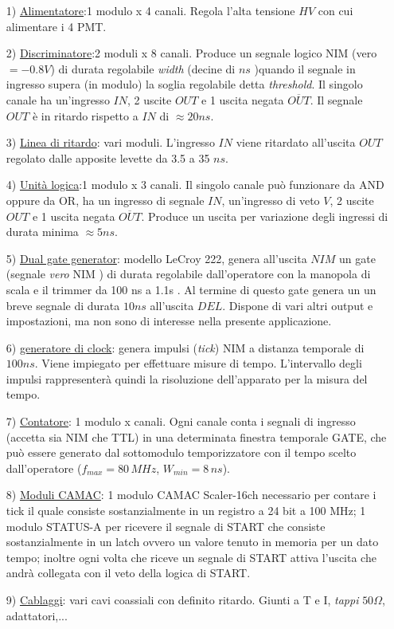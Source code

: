 \documentclass[12pt,a4paper,openright,twoside]{article}
\numberwithin{equation}{section} %
\begin{document}
\begin{enumerate}
\begin{enumerate}
\item[1)] \underline{Alimentatore}:1 modulo x 4 canali. Regola l'alta tensione $HV$ con cui alimentare i 4 PMT.
\item[2)] \underline{Discriminatore}:2 moduli x 8 canali. Produce un segnale logico NIM (vero$=-0.8V$) di durata regolabile \textit{width} (decine di $ns$ )quando il segnale in ingresso supera (in modulo) la soglia regolabile detta \textit{threshold}. Il singolo canale ha un'ingresso $IN$, 2 uscite $OUT$ e 1 uscita negata $\overline{OUT}$. Il segnale $OUT$ è in ritardo rispetto a $IN $ di $\approx 20ns$.
\item[3)] \underline{Linea di ritardo}: vari moduli. L'ingresso $IN$ viene ritardato all'uscita $OUT$ regolato dalle apposite levette da 3.5 a 35 $ns$.
\item[4)] \underline{Unità logica}:1 modulo x 3 canali. Il singolo canale può funzionare da AND oppure da OR, ha un ingresso di segnale $IN$, un'ingresso di veto $V$,  2 uscite $OUT$ e 1 uscita negata $\overline{OUT}$. Produce un uscita per variazione degli ingressi di durata minima $\approx 5 ns$.
\item[5)] \underline{Dual gate generator}: modello LeCroy 222, genera all'uscita $NIM$ un gate (segnale \textit{vero} NIM ) di durata  regolabile dall'operatore con la manopola di scala e il trimmer da 100 ns a 1.1s . Al termine di questo gate genera un un breve segnale di durata $10 ns$ all'uscita $DEL$. Dispone di vari altri output e impostazioni, ma non sono di interesse nella presente applicazione.
\item[6)] \underline{generatore di clock}: genera impulsi (\textit{tick}) NIM a distanza temporale di $100 ns$. Viene impiegato per effettuare misure di tempo. L'intervallo degli impulsi rappresenterà quindi la risoluzione dell'apparato per la misura del tempo.
\item[7)] \underline{Contatore}: 1 modulo x canali. Ogni canale conta i segnali di ingresso (accetta sia NIM che TTL) in una determinata finestra temporale GATE, che può essere generato dal sottomodulo temporizzatore con il tempo scelto dall'operatore ($f_{max}= 80 \, MHz$, $W_{min}= 8 \, ns$).
\item[8)] \underline{Moduli CAMAC}: 1 modulo CAMAC Scaler-16ch necessario per contare i tick il quale consiste sostanzialmente in un registro a 24 bit a 100 MHz;  1 modulo STATUS-A per ricevere il segnale di START che consiste sostanzialmente in un latch ovvero un valore tenuto in memoria per un dato tempo; inoltre ogni volta che riceve un segnale di START attiva l'uscita che andrà collegata con il veto della logica di START.
\item[9)] \underline{Cablaggi}: vari cavi coassiali con definito ritardo. Giunti a T e I, \textit{tappi} $50 \Omega$, adattatori,...




\end{enumerate}
\end{enumerate}
\end{document}

